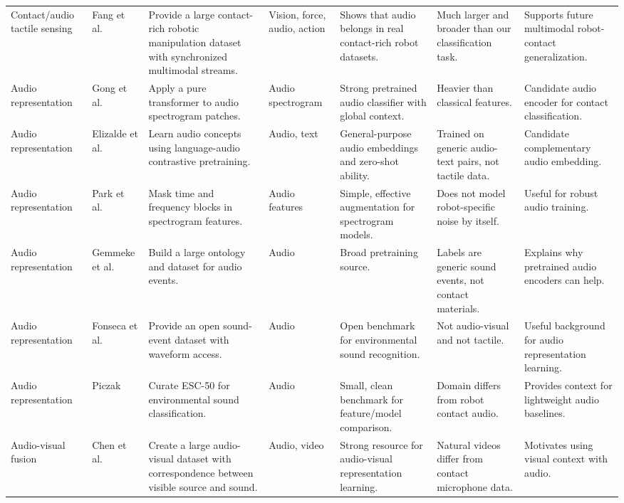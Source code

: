 \documentclass[12pt,a4paper]{article}
\begin{document}
\begin{landscape}
\begin{longtable}{P{2.3cm}P{3.6cm}P{4.0cm}P{2.5cm}P{3.4cm}P{3.4cm}P{4.2cm}}
Contact/audio tactile sensing & Fang et al.~\cite{fang2023rh20t} & Provide a large contact-rich robotic manipulation dataset with synchronized multimodal streams. & Vision, force, audio, action & Shows that audio belongs in real contact-rich robot datasets. & Much larger and broader than our classification task. & Supports future multimodal robot-contact generalization. \\
Audio representation & Gong et al.~\cite{gong2021ast} & Apply a pure transformer to audio spectrogram patches. & Audio spectrogram & Strong pretrained audio classifier with global context. & Heavier than classical features. & Candidate audio encoder for contact classification. \\
Audio representation & Elizalde et al.~\cite{elizalde2022clap} & Learn audio concepts using language-audio contrastive pretraining. & Audio, text & General-purpose audio embeddings and zero-shot ability. & Trained on generic audio-text pairs, not tactile data. & Candidate complementary audio embedding. \\
Audio representation & Park et al.~\cite{park2019specaugment} & Mask time and frequency blocks in spectrogram features. & Audio features & Simple, effective augmentation for spectrogram models. & Does not model robot-specific noise by itself. & Useful for robust audio training. \\
Audio representation & Gemmeke et al.~\cite{gemmeke2017audioset} & Build a large ontology and dataset for audio events. & Audio & Broad pretraining source. & Labels are generic sound events, not contact materials. & Explains why pretrained audio encoders can help. \\
Audio representation & Fonseca et al.~\cite{fonseca2020fsd50k} & Provide an open sound-event dataset with waveform access. & Audio & Open benchmark for environmental sound recognition. & Not audio-visual and not tactile. & Useful background for audio representation learning. \\
Audio representation & Piczak~\cite{piczak2015esc50} & Curate ESC-50 for environmental sound classification. & Audio & Small, clean benchmark for feature/model comparison. & Domain differs from robot contact audio. & Provides context for lightweight audio baselines. \\
Audio-visual fusion & Chen et al.~\cite{chen2020vggsound} & Create a large audio-visual dataset with correspondence between visible source and sound. & Audio, video & Strong resource for audio-visual representation learning. & Natural videos differ from contact microphone data. & Motivates using visual context with audio. \\

\end{longtable}
\end{landscape}
\end{document}
